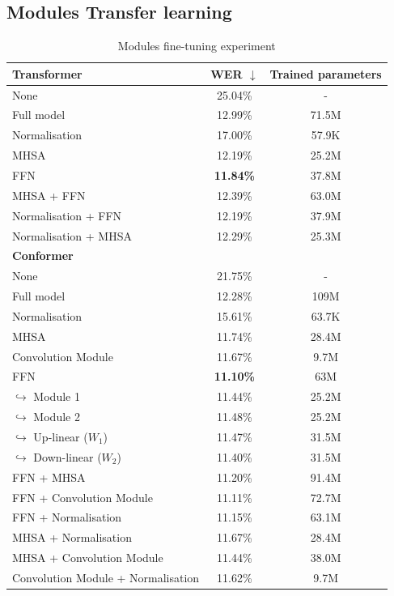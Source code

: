 \subsection{Modules Transfer learning}
\begin{table}
    \begin{center}
        \begin{tabular}{lcc}\hline
            \textbf{Transformer}    & WER  $\downarrow$   & Trained parameters \\ \hline
            None & 25.04\% & -   \\
            Full model   & 12.99\% & 71.5M   \\ \hline
            Normalisation & 17.00\% & 57.9K  \\
            MHSA & 12.19\% & 25.2M  \\
            FFN    & \textbf{11.84\%}     &  37.8M \\ \hline
            MHSA + FFN & 12.39\% & 63.0M \\
            Normalisation + FFN & 12.19\% & 37.9M \\
            Normalisation + MHSA & 12.29\% & 25.3M\\ \hline \hline
            \textbf{Conformer}    &     & \\ \hline
            None & 21.75\% & -   \\
            Full model   & 12.28\% & 109M   \\ \hline
            Normalisation & 15.61\% & 63.7K  \\
            \ac{MHSA} & 11.74\% & 28.4M  \\
            Convolution Module & 11.67\% & 9.7M \\
            FFN    & \textbf{11.10\%}     &  63M \\
            \quad $\hookrightarrow$ Module 1    & 11.44\%     &  25.2M \\
            \quad $\hookrightarrow$ Module 2    & 11.48\%     &  25.2M \\
            \quad $\hookrightarrow$ Up-linear ($W_1$)    & 11.47\%     &  31.5M \\
            \quad $\hookrightarrow$ Down-linear ($W_2$)    & 11.40\%     &  31.5M \\ \hline
            FFN + MHSA & 11.20\% & 91.4M \\
            FFN + Convolution Module & 11.11\% & 72.7M \\
            FFN + Normalisation & 11.15\% & 63.1M \\
            MHSA + Normalisation & 11.67\% & 28.4M \\
            MHSA + Convolution Module & 11.44\% & 38.0M \\
            Convolution Module + Normalisation & 11.62\% & 9.7M\\ \hline
        \end{tabular}
    \end{center}
    \caption{Modules fine-tuning experiment}
    \label{table:ModulesTL}
\end{table}
